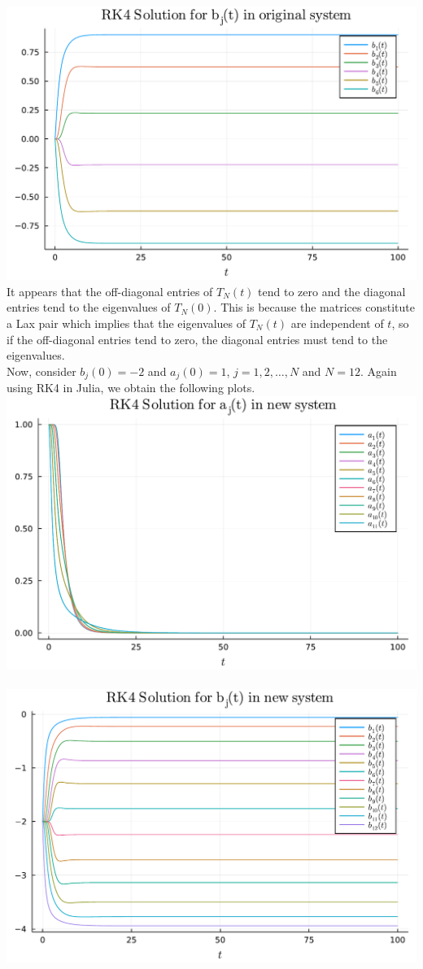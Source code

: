 \documentclass{article}
\begin{document}
\includegraphics[scale=0.5]{p7i.pdf}\\
It appears that the off-diagonal entries of $T_N(t)$ tend to zero and the diagonal entries tend to the eigenvalues of $T_N(0)$. This is because the matrices constitute a Lax pair which implies that the eigenvalues of $T_N(t)$ are independent of $t$, so if the off-diagonal entries tend to zero, the diagonal entries must tend to the eigenvalues.\\
Now, consider $b_j(0) = -2$ and $a_j(0) = 1$, $j = 1,2,\ldots,N$ and $N = 12$. Again using RK4 in Julia, we obtain the following plots.\\
\includegraphics[scale=0.5]{p7iv.pdf}\\
\\
\includegraphics[scale=0.5]{p7iii.pdf}\\
\end{document}
